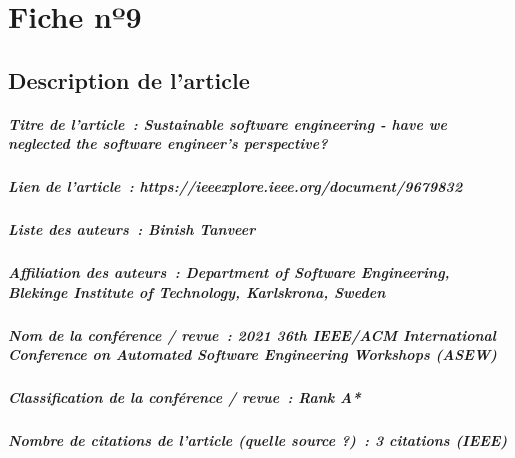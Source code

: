 
\chapter{Fiche nº9} %
\label{app:Fiche9} %

\section{Description de l'article}

\paragraph{Titre de l'article~: \textnormal{Sustainable software engineering - have we neglected the software engineer's perspective?}}
\paragraph{Lien de l'article~: \textnormal{https://ieeexplore.ieee.org/document/9679832}}
\paragraph{Liste des auteurs~: \textnormal{Binish Tanveer}}
\paragraph{Affiliation des auteurs~: \textnormal{Department of Software Engineering, Blekinge Institute of Technology, Karlskrona, Sweden}}
\paragraph{Nom de la conférence / revue~: \textnormal{2021 36th IEEE/ACM International Conference on Automated Software Engineering Workshops (ASEW)}}
\paragraph{Classification de la conférence / revue~: \textnormal{Rank A*}}
\paragraph{Nombre de citations de l'article (quelle source ?)~: \textnormal{3 citations (IEEE)}}



